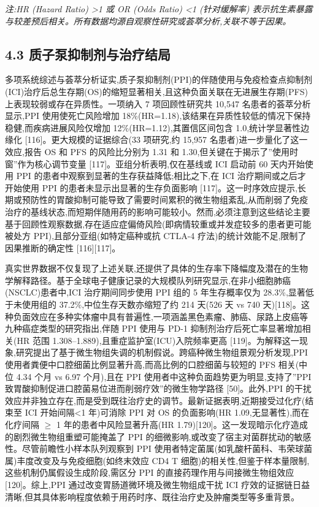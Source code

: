 \emph{注:HR (Hazard Ratio) \textgreater1 或 OR (Odds Ratio) \textless1 (针对缓解率) 表示抗生素暴露与较差预后相关。所有数据均源自观察性研究或荟萃分析,关联不等于因果。}

\subsection{4.3 质子泵抑制剂与治疗结局}\label{ux8d28ux5b50ux6cf5ux6291ux5236ux5242ux4e0eux6cbbux7597ux7ed3ux5c40}

多项系统综述与荟萃分析证实,质子泵抑制剂(PPI)的伴随使用与免疫检查点抑制剂(ICI)治疗后总生存期(OS)的缩短显著相关,且这种负面关联在无进展生存期(PFS)上表现较弱或存在异质性。一项纳入 7 项回顾性研究共 10,547 名患者的荟萃分析显示,PPI 使用使死亡风险增加 18\%(HR=1.18),该结果在异质性较低的情况下保持稳健,而疾病进展风险仅增加 12\%(HR=1.12),其置信区间包含 1.0,统计学显著性边缘化 {[}116{]}。更大规模的证据综合(33 项研究,约 15,957 名患者)进一步量化了这一效应,报告 OS 和 PFS 的风险比分别为 1.31 和 1.30,但关键在于揭示了''使用时窗''作为核心调节变量 {[}117{]}。亚组分析表明,仅在基线或 ICI 启动前 60 天内开始使用 PPI 的患者中观察到显著的生存获益降低;相比之下,在 ICI 治疗期间或之后才开始使用 PPI 的患者未显示出显著的生存负面影响 {[}117{]}。这一时序效应提示,长期或预防性的胃酸抑制可能导致了需要时间累积的微生物组紊乱,从而削弱了免疫治疗的基线状态,而短期伴随用药的影响可能较小。然而,必须注意到这些结论主要基于回顾性观察数据,存在适应症偏倚风险(即病情较重或并发症较多的患者更可能被处方 PPI),且部分亚组(如特定癌种或抗 CTLA-4 疗法)的统计效能不足,限制了因果推断的确定性 {[}116{]}{[}117{]}。

真实世界数据不仅复现了上述关联,还提供了具体的生存率下降幅度及潜在的生物学解释路径。基于全球电子健康记录的大规模队列研究显示,在非小细胞肺癌(NSCLC)患者中,ICI 治疗期间同步使用 PPI 组的 5 年生存概率仅为 28.3\%,显著低于未使用组的 37.2\%,中位生存天数亦缩短了约 214 天(526 天 vs 740 天){[}118{]}。这种负面效应在多种实体瘤中具有普遍性,一项涵盖黑色素瘤、肺癌、尿路上皮癌等九种癌症类型的研究指出,伴随 PPI 使用与 PD-1 抑制剂治疗后死亡率显著增加相关(HR 范围 1.308--1.889),且重症监护室(ICU)入院频率更高 {[}119{]}。为解释这一现象,研究提出了基于微生物组失调的机制假说。跨癌种微生物组景观分析发现,PPI 使用者粪便中口腔细菌比例显著升高,而高比例的口腔细菌与较短的 PFS 相关(中位 4.34 个月 vs 6.97 个月),且在 PPI 使用者中这种负面趋势更为明显,支持了''PPI 致胃酸抑制促进口腔菌易位进而削弱疗效''的微生物学路径 {[}50{]}。此外,PPI 的干扰效应并非独立存在,而是受到既往治疗史的调节。最新证据表明,近期接受过化疗(结束至 ICI 开始间隔\textless1 年)可消除 PPI 对 OS 的负面影响(HR 1.09,无显著性),而在化疗间隔 \(\geq\) 1 年的患者中风险显著升高(HR 1.79){[}120{]}。这一发现暗示化疗造成的剧烈微生物组重塑可能掩盖了 PPI 的细微影响,或改变了宿主对菌群扰动的敏感性。尽管前瞻性小样本队列观察到 PPI 使用者特定菌属(如乳酸杆菌科、韦荣球菌属)丰度改变及与免疫细胞(如终末效应 CD4 T 细胞)的相关性,但鉴于样本量限制,这些机制仍属假设生成阶段,需区分 PPI 的直接药理作用与间接微生物组效应 {[}120{]}。综上,PPI 通过改变胃肠道微环境及微生物组成干扰 ICI 疗效的证据链日益清晰,但其具体影响程度依赖于用药时序、既往治疗史及肿瘤类型等多重背景。

